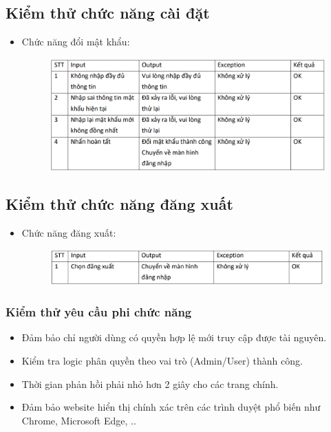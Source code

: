 \documentclass{article}
\begin{document}
\subsection{Kiểm thử chức năng cài đặt}
\begin{itemize}
    \item Chức năng đổi mật khẩu:
    \begin{figure}[H]
        \centering
        \includegraphics[width=1\textwidth]{Kiểm thử/Kiểm thử đổi mk.png}
    \end{figure}   
\end{itemize}
\subsection{Kiểm thử chức năng đăng xuất}
\begin{itemize}
    \item Chức năng đăng xuất:
    \begin{figure}[H]
        \centering
        \includegraphics[width=1\textwidth]{Kiểm thử/KT đăng xuất.png}
    \end{figure}   
\end{itemize}
\subsubsection{Kiểm thử yêu cầu phi chức năng}
\begin{itemize}
    \item Đảm bảo chỉ người dùng có quyền hợp lệ mới truy cập được tài nguyên.
    \item Kiểm tra logic phân quyền theo vai trò (Admin/User) thành công.
    \item Thời gian phản hồi phải nhỏ hơn 2 giây cho các trang chính. 
    \item Đảm bảo website hiển thị chính xác trên các trình duyệt phổ biến như Chrome, Microsoft Edge, ..
\end{itemize}
 
\end{document}
